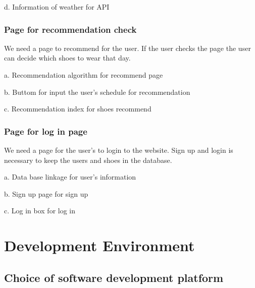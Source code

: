 \documentclass[conference]{IEEEtran}
\begin{document}
d. Information of weather for API\\

\subsubsection{Page for recommendation check}We need a page to recommend for the user. If the user checks the page the user can decide which shoes to wear that day.

a. Recommendation  algorithm for recommend page

b. Buttom for input the user's schedule for recommendation

c. Recommendation index for shoes recommend\\
 
\subsubsection{Page for log in page}We need a page for the user's to login to the website. Sign up and login is necessary to keep the users and shoes in the database.

a. Data base linkage for user's information

b. Sign up page for sign up

c. Log in box for log in \\





\section{Development Environment}

\subsection{Choice of software development platform}
\end{document}
